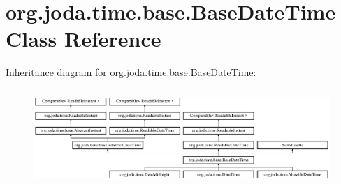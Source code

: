 \hypertarget{classorg_1_1joda_1_1time_1_1base_1_1_base_date_time}{\section{org.\-joda.\-time.\-base.\-Base\-Date\-Time Class Reference}
\label{classorg_1_1joda_1_1time_1_1base_1_1_base_date_time}
}
Inheritance diagram for org.\-joda.\-time.\-base.\-Base\-Date\-Time\-:\begin{figure}[H]
\begin{center}
\leavevmode
\includegraphics[height=3.700440cm]{classorg_1_1joda_1_1time_1_1base_1_1_base_date_time}
\end{center}
\end{figure}
